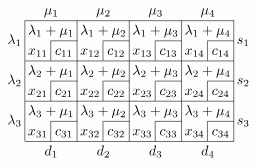 \[
	\arraycolsep=2pt\def\arraystretch{1.2}
	\begin{array}{c|c|c|c|c|c|c|c|c|c}
		\multicolumn{1}{c}{}           & \multicolumn{2}{c}{\mu_1}              & \multicolumn{2}{c}{\mu_2}              & \multicolumn{2}{c}{\mu_3}              & \multicolumn{2}{c}{\mu_4}              & \multicolumn{1}{c}{}                                                          \\\cline{2-9}
		\multirow{2}{*}{\(\lambda_1\)} & \multicolumn{2}{c|}{\lambda_1 + \mu_1} & \multicolumn{2}{c|}{\lambda_1 + \mu_2} & \multicolumn{2}{c|}{\lambda_1 + \mu_3} & \multicolumn{2}{c|}{\lambda_1 + \mu_4} & \multirow{2}{*}{\(s_1\)}                                                      \\\cline{3-3}\cline{5-5}\cline{7-7}\cline{9-9}
		                               & \multicolumn{1}{c|}{x_{11}}            & c_{11}                                 & \multicolumn{1}{c|}{x_{12}}            & c_{12}                                 & \multicolumn{1}{c|}{x_{13}} & c_{13} & \multicolumn{1}{c|}{x_{14}} & c_{14} & \\\cline{2-9}
		\multirow{2}{*}{\(\lambda_2\)} & \multicolumn{2}{c|}{\lambda_2 + \mu_1} & \multicolumn{2}{c|}{\lambda_2 + \mu_2} & \multicolumn{2}{c|}{\lambda_2 + \mu_3} & \multicolumn{2}{c|}{\lambda_2 + \mu_4} & \multirow{2}{*}{\(s_2\)}                                                      \\\cline{3-3}\cline{5-5}\cline{7-7}\cline{9-9}
		                               & \multicolumn{1}{c|}{x_{21}}            & c_{21}                                 & \multicolumn{1}{c|}{x_{22}}            & c_{22}                                 & \multicolumn{1}{c|}{x_{23}} & c_{23} & \multicolumn{1}{c|}{x_{24}} & c_{24} & \\\cline{2-9}
		\multirow{2}{*}{\(\lambda_3\)} & \multicolumn{2}{c|}{\lambda_3 + \mu_1} & \multicolumn{2}{c|}{\lambda_3 + \mu_2} & \multicolumn{2}{c|}{\lambda_3 + \mu_3} & \multicolumn{2}{c|}{\lambda_3 + \mu_4} & \multirow{2}{*}{\(s_3\)}                                                      \\\cline{3-3}\cline{5-5}\cline{7-7}\cline{9-9}
		                               & \multicolumn{1}{c|}{x_{31}}            & c_{31}                                 & \multicolumn{1}{c|}{x_{32}}            & c_{32}                                 & \multicolumn{1}{c|}{x_{33}} & c_{33} & \multicolumn{1}{c|}{x_{34}} & c_{34} & \\\cline{2-9}
		\multicolumn{1}{c}{}           & \multicolumn{2}{c}{d_1}                & \multicolumn{2}{c}{d_2}                & \multicolumn{2}{c}{d_3}                & \multicolumn{2}{c}{d_4}                & \multicolumn{1}{c}{}
	\end{array}
\]

